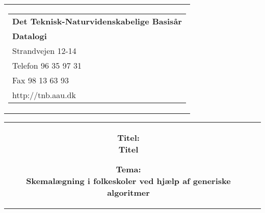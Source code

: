 \documentclass[12pt,hidelinks]{article}
\begin{document}
	\begin{titlepage}
	\begin{nopagebreak}
	{\small\samepage 
	\hfill\begin{tabular}{r}
	\parbox{6cm}{  
	\hfill \parbox{4.9cm}{\begin{tabular}{l}
	{\sf\small \textbf{Det Teknisk-Naturvidenskabelige Basis{\aa}r }}\\
	{\sf\small  \textbf{Datalogi}} \\
	{\sf\small Strandvejen 12-14} \\
	{\sf\small Telefon 96 35 97 31} \\
	{\sf\small Fax 98 13 63 93} \\
	{\sf\small http://tnb.aau.dk}
	\end{tabular}}}
	\\
	\end{tabular}

	\begin{tabular}{cc}
	\parbox{7cm}{
	\begin{description}

	\item {\bf Titel: \\Titel} 
	  
	\item {\bf Tema: \\Skemalægning i folkeskoler ved hjælp af generiske algoritmer} 

	\end{description}

	\parbox{7cm}{

}}
\end{tabular}}
\end{nopagebreak}
\end{titlepage}
\end{document}
